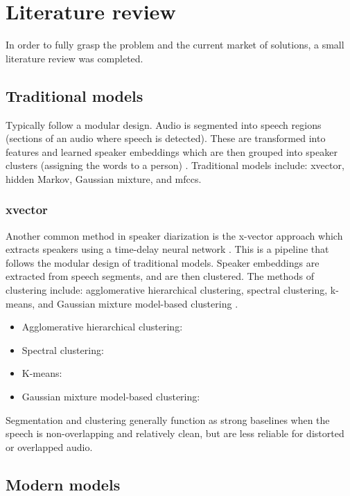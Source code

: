 \documentclass{article}
\begin{document}
\section{Literature review}
In order to fully grasp the problem and the current market of solutions, a small literature review was completed.


\subsection{Traditional models}
Typically follow a modular design. \newline
Audio is segmented into speech regions (sections of an audio where speech is detected). These are transformed into features and learned speaker embeddings which are then grouped into speaker clusters (assigning the words to a person) \cite{efstathiadis2025}. \newline
Traditional models include: \gls{xvector}, hidden Markov, Gaussian mixture, and \gls{mfcc}s.
\subsubsection{\gls{xvector}}
Another common method in speaker diarization is the x-vector approach which extracts speakers using a time-delay neural network \cite{efstathiadis2025}. \newline
This is a pipeline that follows the modular design of traditional models. Speaker embeddings are extracted from speech segments, and are then clustered. The methods of clustering include: agglomerative hierarchical clustering, spectral clustering, k-means, and Gaussian mixture model-based clustering \cite{mitrofanov2025}.
\begin{itemize}
    \item Agglomerative hierarchical clustering: 
    \item Spectral clustering: 
    \item K-means: 
    \item Gaussian mixture model-based clustering: 
\end{itemize}
Segmentation and clustering generally function as strong baselines when the speech is non-overlapping and relatively clean, but are less reliable for distorted or overlapped audio.



\subsection{Modern models}
\end{document}
